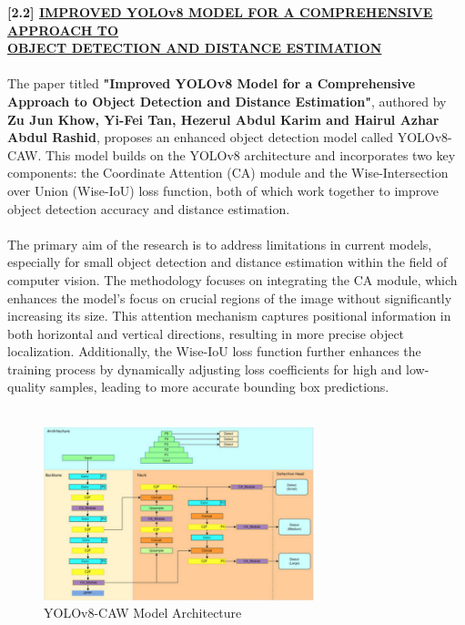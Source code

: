 { \textbf{[2.2] \underline{IMPROVED YOLOv8 MODEL FOR A COMPREHENSIVE APPROACH TO } \\ \underline{OBJECT DETECTION AND DISTANCE ESTIMATION} }
\\\\
%
The paper titled \textbf{"Improved YOLOv8 Model for a Comprehensive Approach to Object Detection and Distance Estimation"}, authored by \textbf{Zu Jun Khow, Yi-Fei Tan, Hezerul Abdul Karim and Hairul Azhar Abdul Rashid}, proposes an enhanced object detection model called YOLOv8-CAW. This model builds on the YOLOv8 architecture and incorporates two key components: the Coordinate Attention (CA) module and the Wise-Intersection over Union (Wise-IoU) loss function, both of which work together to improve object detection accuracy and distance estimation.\\\\
%
The primary aim of the research is to address limitations in current models, especially for small object detection and distance estimation within the field of computer vision. The methodology focuses on integrating the CA module, which enhances the model’s focus on crucial regions of the image without significantly increasing its size. This attention mechanism captures positional information in both horizontal and vertical directions, resulting in more precise object localization. Additionally, the Wise-IoU loss function further enhances the training process by dynamically adjusting loss coefficients for high and low-quality samples, leading to more accurate bounding box predictions.\\\\
%
\begin{figure}[h!]
    \centering
    \includegraphics[width=0.7\textwidth]{images/YOLOv8 CAW Architecture.png}
    \caption{YOLOv8-CAW Model Architecture}
\end{figure}\\\\
}
